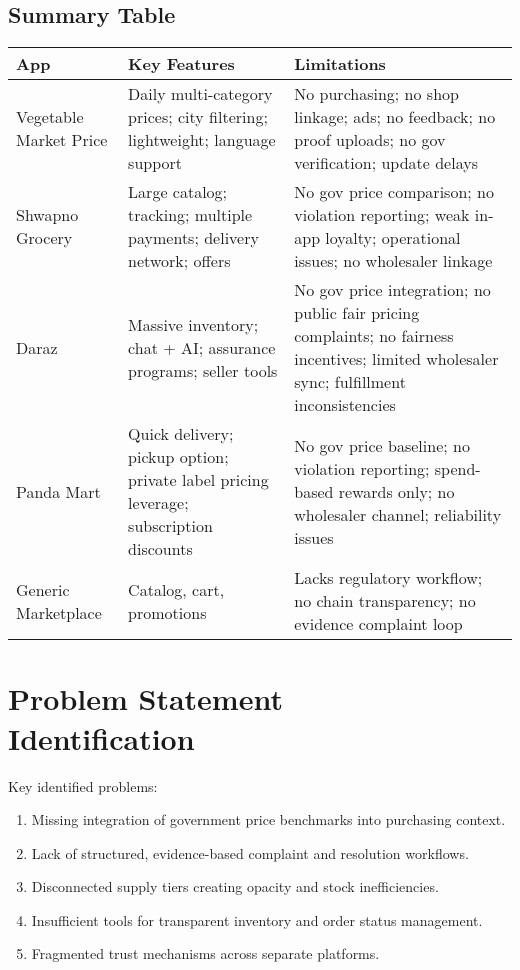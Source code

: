 \documentclass[12pt,a4paper]{article}
\begin{document}
\subsection*{Summary Table}
\begin{longtable}{p{3cm} p{6cm} p{6cm}}
\toprule
\textbf{App} & \textbf{Key Features} & \textbf{Limitations} \\
\midrule
Vegetable Market Price & Daily multi-category prices; city filtering; lightweight; language support & No purchasing; no shop linkage; ads; no feedback; no proof uploads; no gov verification; update delays \\
Shwapno Grocery & Large catalog; tracking; multiple payments; delivery network; offers & No gov price comparison; no violation reporting; weak in-app loyalty; operational issues; no wholesaler linkage \\
Daraz & Massive inventory; chat + AI; assurance programs; seller tools & No gov price integration; no public fair pricing complaints; no fairness incentives; limited wholesaler sync; fulfillment inconsistencies \\
Panda Mart & Quick delivery; pickup option; private label pricing leverage; subscription discounts & No gov price baseline; no violation reporting; spend-based rewards only; no wholesaler channel; reliability issues \\
Generic Marketplace & Catalog, cart, promotions & Lacks regulatory workflow; no chain transparency; no evidence complaint loop \\
\bottomrule
\end{longtable}

\section{Problem Statement \\ \/ Identification}
Key identified problems:
\begin{enumerate}
  \item Missing integration of government price benchmarks into purchasing context.
  \item Lack of structured, evidence-based complaint and resolution workflows.
  \item Disconnected supply tiers creating opacity and stock inefficiencies.
  \item Insufficient tools for transparent inventory and order status management.
  \item Fragmented trust mechanisms across separate platforms.
\end{enumerate}
\end{document}
